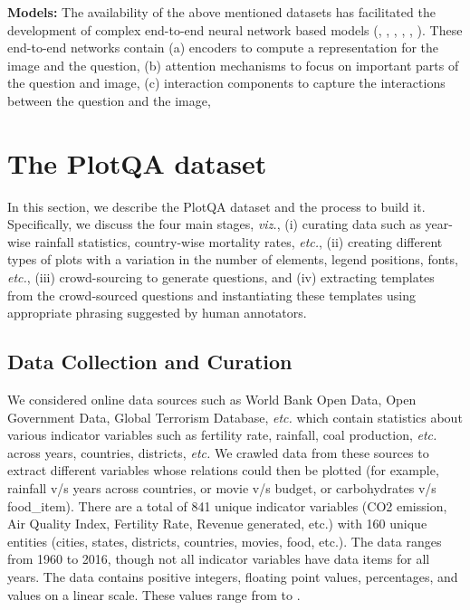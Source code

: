\documentclass[10pt,twocolumn,letterpaper]{article}
\begin{document}
\noindent \textbf{Models:}
The availability of the above mentioned datasets has facilitated the development of complex end-to-end neural network based models (\cite{SAN}, \cite{LuYBP16}, \cite{YangHGDS16}, \cite{NohH16}, \cite{SantoroRBMPBL17}, ).
These end-to-end networks contain (a) encoders to compute a representation for the image and the question, (b) attention mechanisms to focus on important parts of the question and image, (c) interaction components to capture the interactions between the question and the image, 
\section{The PlotQA dataset}

In this section, we describe the PlotQA dataset and the process to build it. 
Specifically, we discuss the four main stages, \textit{viz.}, (i) curating data such as year-wise rainfall statistics, country-wise mortality rates, \textit{etc.}, (ii) creating different types of plots with a variation in the number of elements, legend positions, fonts, \textit{etc.}, (iii) crowd-sourcing to generate questions, and (iv) extracting templates from the crowd-sourced questions and instantiating these templates using appropriate phrasing suggested by human annotators.

\subsection{Data Collection and Curation}

We considered online data sources such as World Bank Open Data, Open Government Data, Global Terrorism Database, \textit{etc.} which contain statistics about various indicator variables such as fertility rate, rainfall, coal production, \textit{etc.} across years, countries, districts, \textit{etc.} 
We crawled data from these sources to extract different variables whose relations could then be plotted (for example, rainfall v/s years across countries, or movie v/s budget, or carbohydrates v/s food\_item). 
There are a total of 841 unique indicator variables (CO2 emission, Air Quality Index, Fertility Rate, Revenue generated, etc.) with 160 unique entities (cities, states, districts, countries, movies, food, etc.).
The data ranges from 1960 to 2016, though not all indicator variables have data items for all years.
The data contains positive integers, floating point values, percentages, and values on a linear scale. These values range from  to . 
\end{document}
